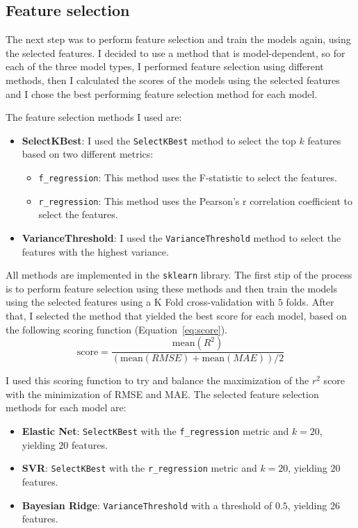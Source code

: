 \documentclass[12pt]{article}
\begin{document}
\subsection{Feature selection}
The next step was to perform feature selection and train the models again, using the
selected features. I decided to use a method that is model-dependent, so for each
of the three model types, I performed feature selection using different methods, then
I calculated the scores of the models using the selected features and I chose the
best performing feature selection method for each model.

The feature selection methods I used are:
\begin{itemize}
    \item \textbf{SelectKBest}: I used the \texttt{SelectKBest} method to select the
    top $k$ features based on two different metrics:
    \begin{itemize}
        \item \texttt{f\_regression}: This method uses the F-statistic to select
        the features.
        \item \texttt{r\_regression}: This method uses the Pearson's r
        correlation coefficient to select the features.
    \end{itemize}
    \item \textbf{VarianceThreshold}: I used the \texttt{VarianceThreshold} method
    to select the features with the highest variance.
\end{itemize}

All methods are implemented in the \texttt{sklearn} library. The first stip of the
process is to perform feature selection using these methods and then train the
models using the selected features using a K Fold cross-validation with $5$ folds.
After that, I selected the method that yielded the best score for each model, based
on the following scoring function (Equation~\ref{eq:score}).
\begin{equation}    
\text{score} = \frac{
    \text{mean}(R^2)
    }{
    (\text{mean}(RMSE) + \text{mean}(MAE)) / 2
    }
    \label{eq:score}
\end{equation}

I used this scoring function to try and balance the maximization of the $r^2$ score
with the minimization of RMSE and MAE. The selected feature selection methods for
each model are:
\begin{itemize}
    \item \textbf{Elastic Net}: \texttt{SelectKBest} with the \texttt{f\_regression}
    metric and $k=20$, yielding $20$ features.
    \item \textbf{SVR}: \texttt{SelectKBest} with the \texttt{r\_regression} metric
    and $k=20$, yielding $20$ features.
    \item \textbf{Bayesian Ridge}: \texttt{VarianceThreshold} with a threshold of
    $0.5$, yielding $26$ features.
\end{itemize}
\end{document}
